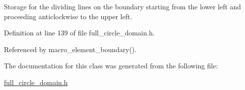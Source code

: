 Storage for the dividing lines on the boundary starting from the lower left and proceeding anticlockwise to the upper left. 



Definition at line 139 of file full\+\_\+circle\+\_\+domain.\+h.



Referenced by macro\+\_\+element\+\_\+boundary().



The documentation for this class was generated from the following file\+:\begin{DoxyCompactItemize}
\item 
\hyperlink{full__circle__domain_8h}{full\+\_\+circle\+\_\+domain.\+h}\end{DoxyCompactItemize}
